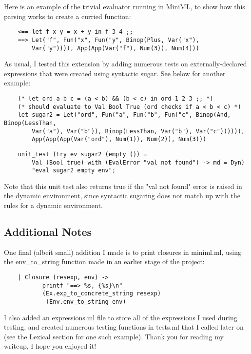 \documentclass{article}
\begin{document}
Here is an example of the trivial evaluator running in MiniML, to show how this parsing works to create a curried function: 

\begin{verbatim}
    <== let f x y = x + y in f 3 4 ;;
    ==> Let("f", Fun("x", Fun("y", Binop(Plus, Var("x"),
        Var("y")))), App(App(Var("f"), Num(3)), Num(4)))
\end{verbatim}

As usual, I tested this extension by adding numerous tests on externally-declared expressions that were created using syntactic sugar. See below for another example:

\begin{verbatim}
    (* let ord a b c = (a < b) && (b < c) in ord 1 2 3 ;; *)
    (* should evaluate to Val Bool True (ord checks if a < b < c) *)
    let sugar2 = Let("ord", Fun("a", Fun("b", Fun("c", Binop(And, Binop(LessThan, 
		Var("a"), Var("b")), Binop(LessThan, Var("b"), Var("c")))))), 
		App(App(App(Var("ord"), Num(1)), Num(2)), Num(3)))
\end{verbatim}

\begin{verbatim}
    unit_test (try ev sugar2 (empty ()) = 
		Val (Bool true) with (EvalError "val not found") -> md = Dyn)
		"eval sugar2 empty env";
\end{verbatim}

Note that this unit test also returns true if the "val not found" error is raised in the dynamic environment, since syntactic sugaring does not match up with the rules for a dynamic environment. 

\pagebreak
\subsection*{Additional Notes}
One final (albeit small) addition I made is to print closures in miniml.ml, using the env\_to\_string function made in an earlier stage of the project:
\begin{verbatim}
    | Closure (resexp, env) -> 
           printf "==> %s, {%s}\n" 
           (Ex.exp_to_concrete_string resexp)
            (Env.env_to_string env)
\end{verbatim}
I also added an expressions.ml file to store all of the expressions I used during testing, and created numerous testing functions in tests.ml that I called later on (see the Lexical section for one such example). Thank you for reading my writeup, I hope you enjoyed it!
\end{document}
